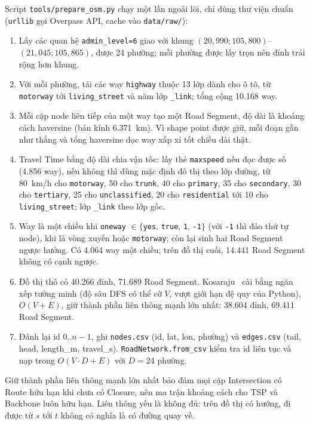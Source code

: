 Script \texttt{tools/prepare\_osm.py} chạy một lần ngoài lõi, chỉ dùng thư viện chuẩn (\texttt{urllib} gọi Overpass API, cache vào \texttt{data/raw/}):
\begin{enumerate}
\item Lấy các quan hệ \texttt{admin\_level=6} giao với khung $(20{,}990;105{,}800)$--$(21{,}045;105{,}865)$, được 24 phường; mỗi phường được lấy trọn nên đỉnh trải rộng hơn khung.
\item Với mỗi phường, tải các way \texttt{highway} thuộc 13 lớp dành cho ô tô, từ \texttt{motorway} tới \texttt{living\_street} và năm lớp \texttt{\_link}; tổng cộng 10.168 way.
\item Mỗi cặp node liên tiếp của một way tạo một Road Segment, độ dài là khoảng cách haversine (bán kính 6.371~km). Vì shape point được giữ, mỗi đoạn gần như thẳng và tổng haversine dọc way xấp xỉ tốt chiều dài thật.
\item Travel Time bằng độ dài chia vận tốc: lấy thẻ \texttt{maxspeed} nếu đọc được số (4.856 way), nếu không thì dùng mặc định đô thị theo lớp đường, từ 80~km/h cho \texttt{motorway}, 50 cho \texttt{trunk}, 40 cho \texttt{primary}, 35 cho \texttt{secondary}, 30 cho \texttt{tertiary}, 25 cho \texttt{unclassified}, 20 cho \texttt{residential} tới 10 cho \texttt{living\_street}; lớp \texttt{\_link} theo lớp gốc.
\item Way là một chiều khi \texttt{oneway} $\in\{$\texttt{yes}, \texttt{true}, \texttt{1}, \texttt{-1}$\}$ (với \texttt{-1} thì đảo thứ tự node), khi là vòng xuyến hoặc \texttt{motorway}; còn lại sinh hai Road Segment ngược hướng. Có 4.064 way một chiều; trên đồ thị cuối, 14.441 Road Segment không có cạnh ngược.
\item Đồ thị thô có 40.266 đỉnh, 71.689 Road Segment. Kosaraju~\cite{clrs2022} cài bằng ngăn xếp tường minh (độ sâu DFS có thể cỡ $V$, vượt giới hạn đệ quy của Python), $O(V+E)$, giữ thành phần liên thông mạnh lớn nhất: 38.604 đỉnh, 69.411 Road Segment.
\item Đánh lại id $0..n-1$, ghi \texttt{nodes.csv} (id, lat, lon, phường) và \texttt{edges.csv} (tail, head, length\_m, travel\_s). \texttt{RoadNetwork.from\_csv} kiểm tra id liên tục và nạp trong $O(V\cdot D+E)$ với $D=24$ phường.
\end{enumerate}
Giữ thành phần liên thông mạnh lớn nhất bảo đảm mọi cặp Intersection có Route hữu hạn khi chưa có Closure, nên ma trận khoảng cách cho TSP và Backbone luôn hữu hạn. Liên thông yếu là không đủ: trên đồ thị có hướng, đi được từ $s$ tới $t$ không có nghĩa là có đường quay về.


